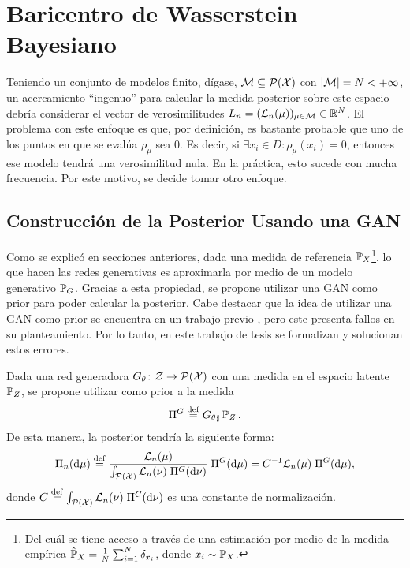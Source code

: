 \section{Baricentro de Wasserstein Bayesiano}\label{sec:bwb}  %


Teniendo un conjunto de modelos finito, dígase, $\Models \subseteq \ProbSpace[\cX] $ con $| \Models | = N < + \infty$, un acercamiento ``ingenuo'' para calcular la medida posterior sobre este espacio debría considerar el vector de verosimilitudes $L_n = (\cL_n(\mu))_{\mu \in \Models} \in \R^N$. El problema con este enfoque es que, por definición, es bastante probable que uno de los puntos en que se evalúa $\rho_\mu$ sea $0$. Es decir, si $\exists x_i \in D \colon \rho_\mu(x_i) = 0$, entonces ese modelo tendrá una verosimilitud nula. En la práctica, esto sucede con mucha frecuencia. Por este motivo, se decide tomar otro enfoque.


\subsection{Construcción de la Posterior Usando una GAN}\label{ssec:construccion-posterior}  %

Como se explicó en secciones anteriores,
dada una medida de referencia $\Prob_X$\footnote{Del cuál se tiene acceso a través de una estimación por medio de la medida empírica $\hat\Prob_X = \frac{1}{N}\sum_{i=1}^{N} \delta_{x_i}$, donde $x_i \sim \Prob_X$.}, lo que hacen las redes generativas es aproximarla por medio de un modelo generativo $\Prob_G$. Gracias a esta propiedad, se propone utilizar una GAN como prior para poder calcular la posterior.
Cabe destacar que la idea de utilizar una GAN como prior se encuentra en un trabajo previo \cite{patel2019bayesian}, pero este presenta fallos en su planteamiento. Por lo tanto, en este trabajo de tesis se formalizan y solucionan estos errores.

Dada una red generadora $G_\theta \colon \cZ \to \ProbSpace[\cX] $ con una medida en el espacio latente $\Prob_Z$, se propone utilizar como prior a la medida
\begin{equation}
    \Pi^G \eqdef \pf{G_\theta} \Prob_Z.
\end{equation}
De esta manera, la posterior tendría la siguiente forma:
\begin{equation}
    \Pi_n(\dd \mu)
    \eqdef \frac{\cL_n(\mu)}{\int_{\ProbSpace[\cX]} \cL_n(\nu) \; \Pi^G(\dd \nu)} \; \Pi^G(\dd \mu)
    = C^{-1} \cL_n(\mu) \; \Pi^G(\dd \mu),
\end{equation}
donde $C \eqdef \int_{\ProbSpace[\cX]} \cL_n(\nu) \; \Pi^G(\dd \nu)$ es una constante de normalización.

